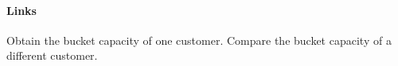 \label{TC-102}
\paragraph{Links} 

\begin{testprocedure}
    \stage Obtain the bucket capacity of one customer.
    \stage Compare the bucket capacity of a different customer.
\end{testprocedure}
